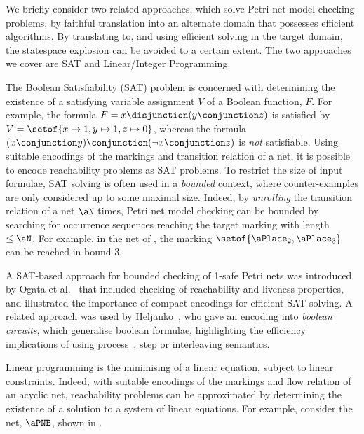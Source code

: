 We briefly consider two related approaches, which solve Petri net model
checking problems, by faithful translation into an alternate domain that
possesses efficient algorithms. By translating to, and using efficient solving
in the target domain, the statespace explosion can be avoided to a certain
extent. The two approaches we cover are SAT and Linear/Integer Programming.


The Boolean Satisfiability (SAT) problem is concerned with determining the
existence of a satisfying variable assignment $V$ of a Boolean function, $F$.
For example, the formula $F = x \disjunction (y \conjunction z)$ is satisfied
by $V = \setof{x \mapsto 1, y \mapsto 1, z \mapsto 0}$, whereas the formula $(x
\conjunction y) \conjunction (\neg x \conjunction z)$ is \emph{not}
satisfiable. Using suitable encodings of the markings and transition relation
of a net, it is possible to encode reachability problems as SAT problems. To
restrict the size of input formulae, SAT solving is often used in a
\emph{bounded} context, where counter-examples are only considered up to some
maximal size. Indeed, by \emph{unrolling} the transition relation of a net
$\aN$ times, Petri net model checking can be bounded by searching for occurrence
sequences reaching the target marking with length $\leq \aN$. For example, in
the net of , the marking $\setof{\aPlace_2, \aPlace_3}$ can be
reached in bound $3$.

A SAT-based approach for bounded checking of 1-safe Petri nets was introduced
by {Ogata et al.}~\cite{Ogata2004} that included checking of reachability and
liveness properties, and illustrated the importance of compact encodings for
efficient SAT solving. A related approach was used by
Heljanko~\cite{Heljanko2001}, who gave an encoding into \emph{boolean
circuits}, which generalise boolean formulae, highlighting the efficiency
implications of using process~\cite{Devill1987}, step or interleaving
semantics.

Linear programming is the minimising of a linear equation, subject to linear
constraints. Indeed, with suitable encodings of the markings and flow relation
of an acyclic net, reachability problems can be approximated by determining the
existence of a solution to a system of linear equations. For example, consider
the net, $\aPNB$, shown in .

